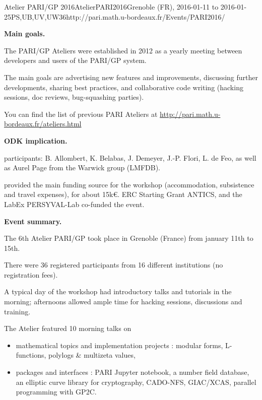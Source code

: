 \begin{event}{Atelier PARI/GP 2016}{AtelierPARI2016}{Grenoble (FR),
2016-01-11 to 2016-01-25}{PS,UB,UV,UW}{36}{http://pari.math.u-bordeaux.fr/Events/PARI2016/}

\textbf{Main goals.}

The PARI/GP Ateliers were established in 2012 as a yearly meeting
between developers and users of the PARI/GP system.

The main goals are advertising new features and improvements,
discussing further developments, sharing best practices, and collaborative
code writing (hacking sessions, doc reviews, bug-squashing parties).

You can find the list of previous PARI Ateliers at
\url{http://pari.math.u-bordeaux.fr/ateliers.html}

\textbf{ODK implication.} 

\ODK participants: B. Allombert, K. Belabas, J. Demeyer, J.-P. Flori,
L. de Feo, as well as Aurel Page from the Warwick group (LMFDB).

\ODK provided the main funding source for the workshop (accommodation,
subsistence and travel expenses), for about 15k\euro. ERC Starting Grant
ANTICS, and the LabEx PERSYVAL-Lab co-funded the event.

\textbf{Event summary.} 

The 6th Atelier PARI/GP took place in Grenoble (France) from january
11th to 15th.

There were 36 registered participants from 16 different institutions
(no registration fees).

A typical day of the workshop had introductory talks and tutorials
in the morning; afternoons allowed ample time for hacking sessions,
discussions and training.

The Atelier featured 10 morning talks on

\begin{itemize}
\item mathematical topics and implementation projects : modular forms,
    L-functions, polylogs \& multizeta values,

\item packages and interfaces : PARI Jupyter notebook, a number field database,
    an elliptic curve library for cryptography, CADO-NFS, GIAC/XCAS,
    parallel programming with GP2C.
\end{itemize}


\end{event}
